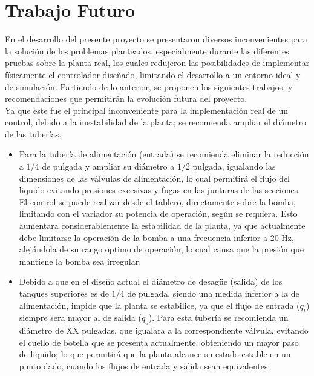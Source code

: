 \documentclass[a4paper,12pt,twoside]{proyectotanquesecci}
\begin{document}

\chapter{Trabajo Futuro}

En el desarrollo del presente proyecto se presentaron diversos inconvenientes para la solución de los problemas planteados, especialmente durante las diferentes pruebas sobre la planta real, los cuales redujeron las posibilidades de implementar físicamente el controlador diseñado, limitando el desarrollo a un entorno ideal y de simulación. Partiendo de lo anterior, se proponen los siguientes trabajos, y recomendaciones que permitirán la evolución futura del proyecto. \\

Ya que este fue el principal inconveniente para la implementación real de un control, debido a la inestabilidad de la planta; se recomienda ampliar el diámetro de las tuberías.

\begin{itemize}
\item Para la tubería de alimentación (entrada) se recomienda eliminar la reducción a $1/4$ de pulgada y ampliar su diámetro a $1/2$ pulgada, igualando las dimensiones de las válvulas de alimentación, lo cual permitirá el flujo del liquido evitando presiones excesivas y fugas en las junturas de las secciones. El control se puede realizar desde el tablero, directamente sobre la bomba, limitando con el variador su potencia de operación, según se requiera. Esto aumentara considerablemente la estabilidad de la planta, ya que actualmente debe limitarse la operación de la bomba a una frecuencia inferior a 20 Hz, alejándola de su rango optimo de operación, lo cual causa que la presión que mantiene la bomba sea irregular.

\item Debido a que en el diseño actual el diámetro de desag\"ue (salida) de los tanques superiores es de $1/4$ de pulgada, siendo una medida inferior a la de alimentación, impide que la planta se estabilice, ya que el flujo de entrada ($q_{i}$) siempre sera mayor al de salida ($q_{o}$). Para esta tubería se recomienda un diámetro de XX pulgadas, que igualara a la correspondiente válvula, evitando el cuello de botella que se presenta actualmente, obteniendo un mayor paso de liquido; lo que permitirá que la planta alcance su estado estable en un punto dado, cuando los flujos de entrada y salida sean equivalentes.
\end{itemize}
\end{document}
